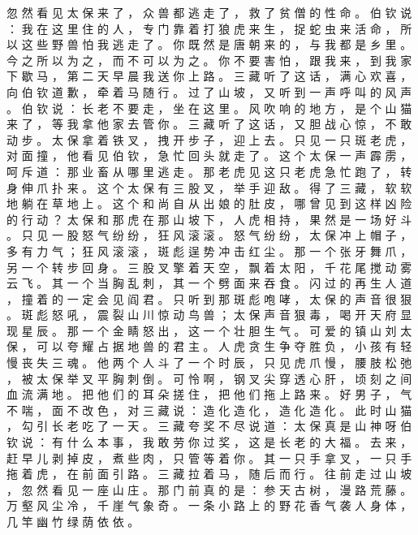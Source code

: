 {忽 然 看 见 太 保 来 了 ， 众 兽 都 逃 走 了 ， 救 了 贫 僧 的 性 命 。
伯 钦 说 ： 我 在 这 里 住 的 人 ， 专 门 靠 着 打 狼 虎 来 生 ， 捉 蛇 虫 来 活 命 ， 所 以 这 些 野 兽 怕 我 逃 走 了 。
你 既 然 是 唐 朝 来 的 ， 与 我 都 是 乡 里 。
今 之 所 以 为 之 ， 而 不 可 以 为 之 。
你 不 要 害 怕 ， 跟 我 来 ， 到 我 家 下 歇 马 ， 第 二 天 早 晨 我 送 你 上 路 。
三 藏 听 了 这 话 ， 满 心 欢 喜 ， 向 伯 钦 道 歉 ， 牵 着 马 随 行 。
过 了 山 坡 ， 又 听 到 一 声 呼 叫 的 风 声 。
伯 钦 说 ： 长 老 不 要 走 ， 坐 在 这 里 。
风 吹 响 的 地 方 ， 是 个 山 猫 来 了 ， 等 我 拿 他 家 去 管 你 。
三 藏 听 了 这 话 ， 又 胆 战 心 惊 ， 不 敢 动 步 。
太 保 拿 着 铁 叉 ， 拽 开 步 子 ， 迎 上 去 。
只 见 一 只 斑 老 虎 ， 对 面 撞 ， 他 看 见 伯 钦 ， 急 忙 回 头 就 走 了 。
这 个 太 保 一 声 霹 雳 ， 呵 斥 道 ： 那 业 畜 从 哪 里 逃 走 。 那 老 虎 见 这 只 老 虎 急 忙 跑 了 ， 转 身 伸 爪 扑 来 。
这 个 太 保 有 三 股 叉 ， 举 手 迎 敌 。
得 了 三 藏 ， 软 软 地 躺 在 草 地 上 。
这 个 和 尚 自 从 出 娘 的 肚 皮 ， 哪 曾 见 到 这 样 凶 险 的 行 动 ？
太 保 和 那 虎 在 那 山 坡 下 ， 人 虎 相 持 ， 果 然 是 一 场 好 斗 。
只 见 一 股 怒 气 纷 纷 ， 狂 风 滚 滚 。
怒 气 纷 纷 ， 太 保 冲 上 帽 子 ， 多 有 力 气 ； 狂 风 滚 滚 ， 斑 彪 逞 势 冲 击 红 尘 。
那 一 个 张 牙 舞 爪 ， 另 一 个 转 步 回 身 。
三 股 叉 擎 着 天 空 ， 飘 着 太 阳 ， 千 花 尾 搅 动 雾 云 飞 。
其 一 个 当 胸 乱 刺 ， 其 一 个 劈 面 来 吞 食 。
闪 过 的 再 生 人 道 ， 撞 着 的 一 定 会 见 阎 君 。
只 听 到 那 斑 彪 咆 哮 ， 太 保 的 声 音 很 狠 。
斑 彪 怒 吼 ， 震 裂 山 川 惊 动 鸟 兽 ； 太 保 声 音 狠 毒 ， 喝 开 天 府 显 现 星 辰 。
那 一 个 金 睛 怒 出 ， 这 一 个 壮 胆 生 气 。
可 爱 的 镇 山 刘 太 保 ， 可 以 夸 耀 占 据 地 兽 的 君 主 。
人 虎 贪 生 争 夺 胜 负 ， 小 孩 有 轻 慢 丧 失 三 魂 。
他 两 个 人 斗 了 一 个 时 辰 ， 只 见 虎 爪 慢 ， 腰 肢 松 弛 ， 被 太 保 举 叉 平 胸 刺 倒 。
可 怜 啊 ， 钢 叉 尖 穿 透 心 肝 ， 顷 刻 之 间 血 流 满 地 。
把 他 们 的 耳 朵 搓 住 ， 把 他 们 拖 上 路 来 。
好 男 子 ， 气 不 喘 ， 面 不 改 色 ， 对 三 藏 说 ： 造 化 造 化 ， 造 化 造 化 。
此 时 山 猫 ， 勾 引 长 老 吃 了 一 天 。
三 藏 夸 奖 不 尽 说 道 ： 太 保 真 是 山 神 呀 伯 钦 说 ： 有 什 么 本 事 ， 我 敢 劳 你 过 奖 ， 这 是 长 老 的 大 福 。
去 来 ， 赶 早 儿 剥 掉 皮 ， 煮 些 肉 ， 只 管 等 着 你 。
其 一 只 手 拿 叉 ， 一 只 手 拖 着 虎 ， 在 前 面 引 路 。
三 藏 拉 着 马 ， 随 后 而 行 。
往 前 走 过 山 坡 ， 忽 然 看 见 一 座 山 庄 。
那 门 前 真 的 是 ： 参 天 古 树 ， 漫 路 荒 藤 。
万 壑 风 尘 冷 ， 千 崖 气 象 奇 。
一 条 小 路 上 的 野 花 香 气 袭 人 身 体 ， 几 竿 幽 竹 绿 荫 依 依 。
}
